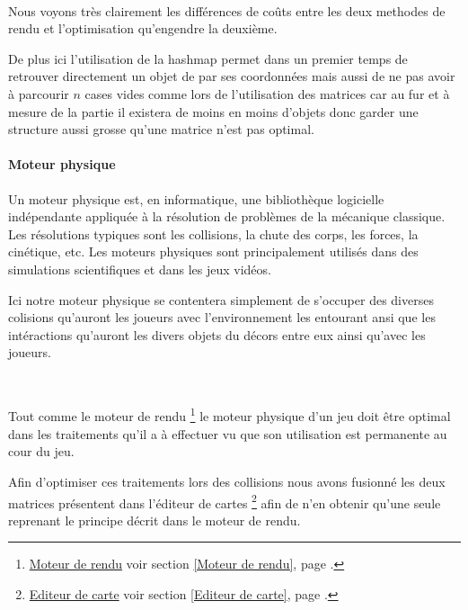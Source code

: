 			$\,$
			
			Nous voyons très clairement les différences de coûts entre les deux methodes
			de rendu et l'optimisation qu'engendre la deuxième.
			
			De plus ici l'utilisation de la hashmap permet dans un premier temps de
			retrouver directement un objet de par ses coordonnées mais aussi de ne pas
			avoir à parcourir $n$ cases vides comme lors de l'utilisation des matrices
			car au fur et à mesure de la partie il existera de moins en moins d'objets
			donc garder une structure aussi grosse qu'une matrice n'est pas optimal.
		
		\paragraph{Moteur physique\\}
		
			\hypertarget{Moteur physique}{}
			\label{Moteur physique}
			
			Un moteur physique est, en informatique, une bibliothèque logicielle 
			indépendante appliquée à la résolution de problèmes de la mécanique
			classique.  Les résolutions typiques sont les collisions, la chute des corps,
			les forces, la cinétique, etc.
			Les moteurs physiques sont principalement utilisés dans des simulations 
			scientifiques et dans les jeux vidéos.
			
			
			Ici notre moteur physique se contentera simplement de s'occuper des diverses
			colisions qu'auront les joueurs avec l'environnement les entourant ansi que
			les intéractions qu'auront les divers objets du décors entre eux ainsi qu'avec les joueurs.

			$\,$		
			
			Tout comme le moteur de rendu
			\footnote{
				\hyperlink{Moteur de rendu}{Moteur de rendu}
				\og voir section \ref{Moteur de rendu}, page \pageref{Moteur de rendu}.\fg
			}
			le moteur physique d'un jeu doit être optimal dans les traitements qu'il a à
			effectuer vu que son utilisation est permanente au cour du jeu.
			
			
			Afin d'optimiser ces traitements lors des collisions nous avons fusionné les
			deux matrices présentent dans l'éditeur de cartes
			\footnote{
				\hyperlink{Editeur de carte}{Editeur de carte}
				\og voir section \ref{Editeur de carte}, page \pageref{Editeur de carte}.\fg
			}
			afin de n'en obtenir qu'une seule reprenant le principe décrit dans le moteur
			de rendu\footnotemark[2].
			
